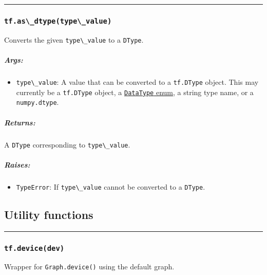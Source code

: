 \begin{center}\rule{0.5\linewidth}{\linethickness}\end{center}

\subsubsection{\texorpdfstring{\lstinline{tf.as\_dtype(type\_value)}
}{tf.as\_dtype(type\_value) }}\label{tf.asux5fdtypetypeux5fvalue}

Converts the given \lstinline{type\_value} to a \lstinline{DType}.

\subparagraph{Args: }\label{args-20}

\begin{itemize}
\tightlist
\item
  \lstinline{type\_value}: A value that can be converted to a
  \lstinline{tf.DType} object. This may currently be a \lstinline{tf.DType}
  object, a
  \href{https://tensorflow.googlesource.com/tensorflow/+/master/tensorflow/core/framework/types.proto}{\lstinline{DataType}
  enum}, a string type name, or a \lstinline{numpy.dtype}.
\end{itemize}

\subparagraph{Returns: }\label{returns-23}

A \lstinline{DType} corresponding to \lstinline{type\_value}.

\subparagraph{Raises: }\label{raises-13}

\begin{itemize}
\tightlist
\item
  \lstinline{TypeError}: If \lstinline{type\_value} cannot be converted to a
  \lstinline{DType}.
\end{itemize}

\subsection{Utility functions }\label{utility-functions}

\begin{center}\rule{0.5\linewidth}{\linethickness}\end{center}

\subsubsection{\texorpdfstring{\lstinline{tf.device(dev)}
}{tf.device(dev) }}\label{tf.devicedev}

Wrapper for \lstinline{Graph.device()} using the default graph.

